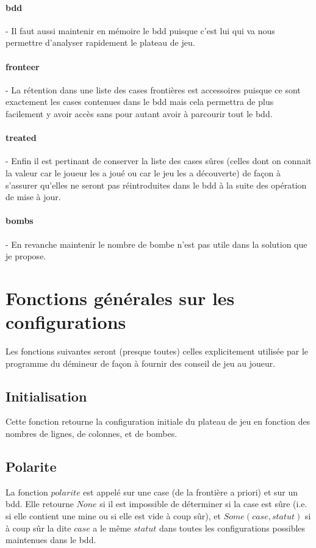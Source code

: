 \documentclass{report}
\begin{document}
	\paragraph{bdd}
	- Il faut aussi maintenir en mémoire le bdd puisque c'est lui qui va nous permettre d'analyser rapidement le plateau de jeu.
	\paragraph{fronteer}\smallskip
	- La rétention dans une liste des cases frontières est accessoires puisque ce sont exactement les cases contenues dans le bdd mais cela permettra de plus facilement y avoir accès sans pour autant avoir à parcourir tout le bdd.
	\paragraph{treated}
	- Enfin il est pertinant de conserver la liste des cases sûres (celles dont on connait la valeur car le joueur les a joué ou car le jeu les a découverte) de façon à s'assurer qu'elles ne seront pas réintroduites dans le bdd à la suite des opération de mise à jour.
	\paragraph{bombs}
	- En revanche maintenir le nombre de bombe n'est pas utile dans la solution que je propose.

\section{Fonctions générales sur les configurations}

	Les fonctions suivantes seront (presque toutes) celles explicitement utilisée par le programme du démineur de façon à fournir des conseil de jeu au joueur.
	
	\subsection{Initialisation}
	Cette fonction retourne la configuration initiale du plateau de jeu en fonction des nombres de lignes, de colonnes, et de bombes.
	 
	\subsection{Polarite}
	La fonction $polarite$ est appelé sur une case (de la frontière a priori) et sur un bdd. Elle retourne $None$ si il est impossible de déterminer si la case est sûre (i.e. si elle contient une mine ou si elle est vide à coup sûr), et $Some (case,statut)$ si à coup sûr la dite $case$ a le même $statut$ dans toutes les configurations possibles maintenues dans le bdd.
	 
\end{document}
